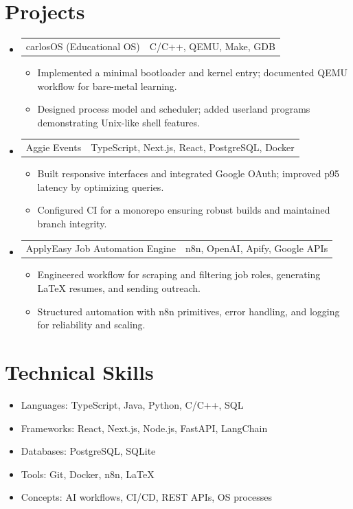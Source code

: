 \documentclass[letterpaper,11pt]{article}
\makeatletter
\newcommand{\resumeItem}[1]{
  \item\small{{#1 \vspace{-2pt}}}
}
\newcommand{\resumeProjectHeading}[2]{
  \item
  \begin{tabular*}{0.97\textwidth}{l@{\extracolsep{\fill}}r}
      \small#1 & #2 \\
  \end{tabular*}\vspace{-7pt}
}
\newcommand{\resumeSubHeadingListStart}{\begin{itemize}[leftmargin=0.15in, label={}]}
\newcommand{\resumeSubHeadingListEnd}{\end{itemize}}
\newcommand{\resumeItemListStart}{\begin{itemize}}
\newcommand{\resumeItemListEnd}{\end{itemize}\vspace{-5pt}}
\makeatother
\begin{document}
\section{Projects}
\resumeSubHeadingListStart
\resumeProjectHeading
{carlosOS (Educational OS)}{C/C++, QEMU, Make, GDB}
\resumeItemListStart
\resumeItem{Implemented a minimal bootloader and kernel entry; documented QEMU workflow for bare-metal learning.}
\resumeItem{Designed process model and scheduler; added userland programs demonstrating Unix-like shell features.}
\resumeItemListEnd

\resumeProjectHeading
{Aggie Events}{TypeScript, Next.js, React, PostgreSQL, Docker}
\resumeItemListStart
\resumeItem{Built responsive interfaces and integrated Google OAuth; improved p95 latency by optimizing queries.}
\resumeItem{Configured CI for a monorepo ensuring robust builds and maintained branch integrity.}
\resumeItemListEnd

\resumeProjectHeading
{ApplyEasy Job Automation Engine}{n8n, OpenAI, Apify, Google APIs}
\resumeItemListStart
\resumeItem{Engineered workflow for scraping and filtering job roles, generating LaTeX resumes, and sending outreach.}
\resumeItem{Structured automation with n8n primitives, error handling, and logging for reliability and scaling.}
\resumeItemListEnd
\resumeSubHeadingListEnd

\section{Technical Skills}
\begin{itemize}[leftmargin=0.15in, label={}]
\item Languages: TypeScript, Java, Python, C/C++, SQL
\item Frameworks: React, Next.js, Node.js, FastAPI, LangChain
\item Databases: PostgreSQL, SQLite
\item Tools: Git, Docker, n8n, LaTeX
\item Concepts: AI workflows, CI/CD, REST APIs, OS processes
\end{itemize}
\end{document}
